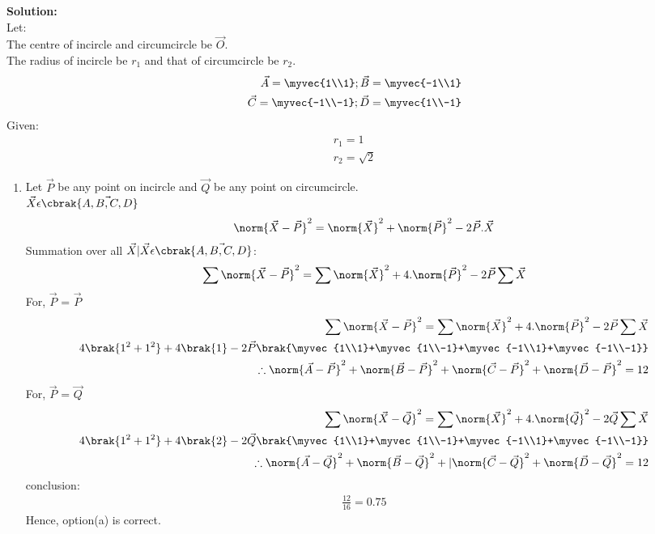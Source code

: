 \documentclass[journal]{IEEEtran}
\begin{document}
\textbf{Solution: }\\
Let:\\
The centre of incircle and circumcircle be $\vec{O}$.\\
The radius of incircle be $r_1$ and that of circumcircle be $r_2$.
\begin{align}
    \vec{A}=\myvec{1\\1};\vec{B}=\myvec{-1\\1}\\
    \vec{C}=\myvec{-1\\-1};\vec{D}=\myvec{1\\-1}
\end{align}
Given:
\begin{align}
    r_1 = 1\\
    r_2 = \sqrt{2}
\end{align}
\begin{enumerate}
\item Let $\vec{P}$ be any point on incircle and $\vec{Q}$ be any point on circumcircle.\\
$\vec{X}\epsilon \cbrak{\vec{A,B,C,D}}$
\begin{align}
    \norm{\vec{X}-\vec{P}}^2 = \norm{\vec{X}}^2 + \norm{\vec{P}}^2 - 2\vec{P}.\vec{X}\\
\end{align}
Summation over all $\vec{X}|\vec{X}\epsilon \cbrak{\vec{A,B,C,D}}$:
\begin{align}
    \sum \norm{\vec{X}-\vec{P}}^2 = \sum \norm{\vec{X}}^2 + 4.\norm{\vec{P}}^2 -2\vec{P}\sum \vec{X}\\
\end{align}
For, $\vec{P}$ = $\vec{P}$
\begin{align}
    \sum \norm{\vec{X}-\vec{P}}^2 = \sum \norm{\vec{X}}^2 + 4.\norm{\vec{P}}^2 -2\vec{P}\sum \vec{X}\\
    4\brak{1^2+1^2} + 4\brak{1}-2\vec{P}\brak{\myvec{1\\1}+\myvec{1\\-1}+\myvec{-1\\1}+\myvec{-1\\-1}}\\
    \therefore \norm{\vec{A}-\vec{P}}^2+\norm{\vec{B}-\vec{P}}^2+\norm{\vec{C}-\vec{P}}^2+\norm{\vec{D}-\vec{P}}^2 = 12
\end{align}
For, $\vec{P}$ = $\vec{Q}$
\begin{align}
    \sum \norm{\vec{X}-\vec{Q}}^2 = \sum \norm{\vec{X}}^2 + 4.\norm{\vec{Q}}^2 -2\vec{Q}\sum \vec{X}\\
    4\brak{1^2+1^2} + 4\brak{2}-2\vec{Q}\brak{\myvec{1\\1}+\myvec{1\\-1}+\myvec{-1\\1}+\myvec{-1\\-1}}\\
    \therefore \norm{\vec{A}-\vec{Q}}^2+\norm{\vec{B}-\vec{Q}}^2+|\norm{\vec{C}-\vec{Q}}^2+\norm{\vec{D}-\vec{Q}}^2 = 12
\end{align}
conclusion:
\begin{align}
    \frac{12}{16}=0.75
\end{align}
Hence, option(a) is correct.


\end{enumerate}
\end{document}
